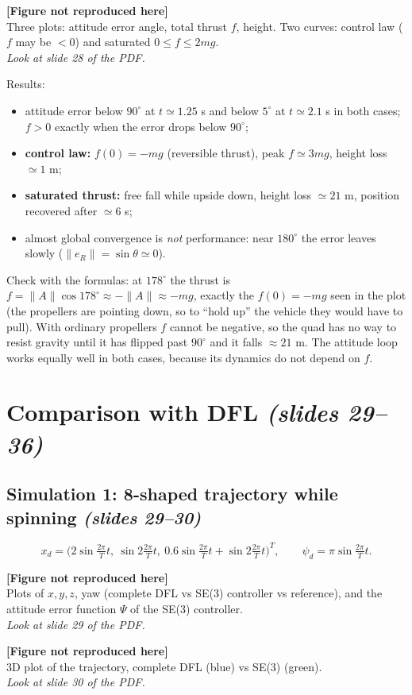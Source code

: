 \documentclass[11pt,a4paper]{article}
\newcommand{\eR}{e_R}
\newcommand{\sli}[1]{\emph{(#1)}}
\theoremstyle{definition}
\theoremstyle{plain}
\theoremstyle{remark}
\newcommand{\placeholder}[2]{%
  \begin{center}
  \begin{tcolorbox}[enhanced,width=0.92\textwidth,colback=gray!4,colframe=black!40,
    boxrule=0.6pt,borderline={0.6pt}{0pt}{black!40,dashed},halign=center,valign=center,height=4.2cm]
  \textbf{[Figure not reproduced here]}\\[2pt] #1\\[2pt]
  \emph{Look at slide #2 of the PDF.}
  \end{tcolorbox}
  \end{center}}
\begin{document}
\placeholder{Three plots: attitude error angle, total thrust $f$, height. Two curves: control law ($f$ may be $<0$) and saturated $0\le f\le2mg$.}{28}

Results:
\begin{itemize}
  \item attitude error below $90^\circ$ at $t\simeq1.25$ s and below $5^\circ$ at $t\simeq2.1$ s in both cases; $f>0$ exactly when the error drops below $90^\circ$;
  \item \textbf{control law:} $f(0)=-mg$ (reversible thrust), peak $f\simeq3mg$, height loss $\simeq1$ m;
  \item \textbf{saturated thrust:} free fall while upside down, height loss $\simeq21$ m, position recovered after $\simeq6$ s;
  \item almost global convergence is \emph{not} performance: near $180^\circ$ the error leaves slowly ($\|\eR\|=\sin\theta\simeq0$).
\end{itemize}

\begin{intuition}
Check with the formulas: at $178^\circ$ the thrust is $f=\|A\|\cos178^\circ\approx-\|A\|\approx-mg$, exactly the $f(0)=-mg$ seen in the plot (the propellers are pointing down, so to ``hold up'' the vehicle they would have to pull). With ordinary propellers $f$ cannot be negative, so the quad has no way to resist gravity until it has flipped past $90^\circ$ and it falls $\approx21$ m. The attitude loop works equally well in both cases, because its dynamics do not depend on $f$.
\end{intuition}

\section{Comparison with DFL \sli{slides 29--36}}

\subsection{Simulation 1: 8-shaped trajectory while spinning \sli{slides 29--30}}

\[
x_d=\Big(2\sin\tfrac{2\pi}Tt,\ \sin2\tfrac{2\pi}Tt,\ 0.6\sin\tfrac{2\pi}Tt+\sin2\tfrac{2\pi}Tt\Big)^T,\qquad\psi_d=\pi\sin\tfrac{2\pi}Tt .
\]

\placeholder{Plots of $x,y,z$, yaw (complete DFL vs SE(3) controller vs reference), and the attitude error function $\Psi$ of the SE(3) controller.}{29}
\placeholder{3D plot of the trajectory, complete DFL (blue) vs SE(3) (green).}{30}
\end{document}
